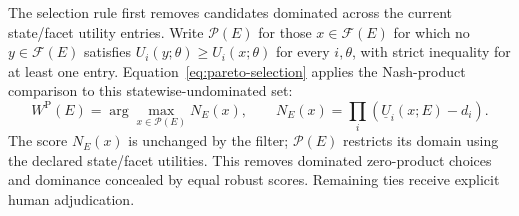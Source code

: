 \documentclass[oneside,10pt,english]{swissi}
\begin{document}
The selection rule first removes candidates dominated across the current state/facet utility entries. Write $\mathcal P(E)$ for those $x\in\mathcal F(E)$ for which no $y\in\mathcal F(E)$ satisfies $U_i(y;\theta)\ge U_i(x;\theta)$ for every $i,\theta$, with strict inequality for at least one entry. Equation~\eqref{eq:pareto-selection} applies the Nash-product comparison to this statewise-undominated set:
\begin{equation}
 W^{\mathrm P}(E)=\arg\max_{x\in\mathcal P(E)}N_E(x),\qquad
 N_E(x)=\prod_i(\underline U_i(x;E)-d_i).
 \label{eq:pareto-selection}
\end{equation}
The score $N_E(x)$ is unchanged by the filter; $\mathcal P(E)$ restricts its domain using the declared state/facet utilities. This removes dominated zero-product choices and dominance concealed by equal robust scores. Remaining ties receive explicit human adjudication.
\end{document}
